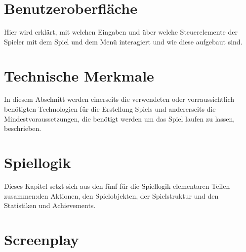 \documentclass[a4paper,12pt]{article}
\begin{document}
    \newpage
    \section{Benutzeroberfläche}\label{sec:benutzeroberflache}
    Hier wird erklärt, mit welchen Eingaben und über welche Steuerelemente der Spieler mit dem Spiel und dem Menü interagiert und wie diese aufgebaut sind.\\
    
    \newpage
    

    \newpage
    \section{Technische Merkmale}\label{sec:technische-merkmale}
    In diesem Abschnitt werden einerseits die verwendeten oder vorraussichtlich benötigten Technologien für die Erstellung Spiels und andererseits die Mindestvoraussetzungen, die benötigt werden um das Spiel laufen zu lassen, beschrieben.\\
    
    

    \newpage
    \section{Spiellogik}\label{sec:spiellogik}
    Dieses Kapitel setzt sich aus den fünf für die Spiellogik elementaren Teilen zusammen:\newline den Aktionen, den Spielobjekten, der Spielstruktur und den Statistiken und Achievements.
    
    \newpage
    
    \newpage
    
    
    \newpage
    

    \newpage
    \section{Screenplay}\label{sec:screenplay}
    
\end{document}
